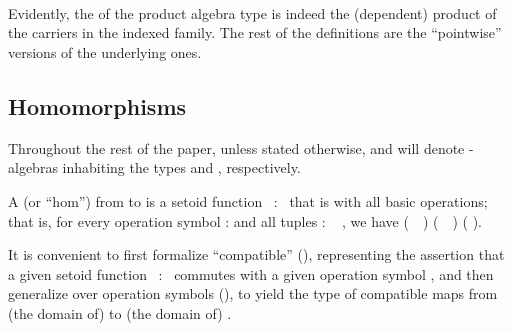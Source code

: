 \begin{code}
\\
%
\\[\AgdaEmptyExtraSkip]%
%
\>[1]\AgdaSpace{}%
\AgdaSymbol{(}\AgdaSpace{}%
\AgdaSymbol{(}\AgdaSpace{}%
\AgdaSymbol{))}\AgdaSpace{}%
\AgdaSymbol{(}\AgdaSpace{}%
\AgdaOperator{\AgdaInductiveConstructor{,}}\AgdaSpace{}%
\AgdaSpace{}%
\AgdaSymbol{)}\AgdaSpace{}%
\AgdaSymbol{=}\AgdaSpace{}%
\AgdaSpace{}%
\AgdaSpace{}%
\AgdaSpace{}%
\AgdaSpace{}%
\AgdaSymbol{(}\AgdaSpace{}%
\AgdaSymbol{(}\AgdaSpace{}%
\AgdaSymbol{))}\AgdaSpace{}%
\AgdaSymbol{(}\AgdaSpace{}%
\AgdaOperator{\AgdaInductiveConstructor{,}}\AgdaSpace{}%
\AgdaSpace{}%
\AgdaSpace{}%
\AgdaSpace{}%
\AgdaSymbol{)}\<%
\\
\>[0]\<%
\end{code}
\noindent Evidently, the  of the product algebra type is indeed the (dependent)
product of the carriers in the indexed family. The rest of the definitions are the ``pointwise''
versions of the underlying ones.

\subsection{Homomorphisms}\label{homomorphisms}
Throughout the rest of the paper, unless stated otherwise,  and 
will denote -algebras inhabiting the types    and
  , respectively.

A  (or ``hom'') from
 to  is a setoid function ~:~  
that is  with all basic operations; that is, for
every operation symbol  :  and all tuples
 : ~  , we have  
(~~)  
(~~)   ( \au{}).

It is convenient to first formalize ``compatible'' (),
representing the assertion that a given setoid function
~:~   commutes with a given
operation symbol , and then generalize over operation symbols (),
to yield the type of compatible maps from (the domain of)  to (the domain of) .


